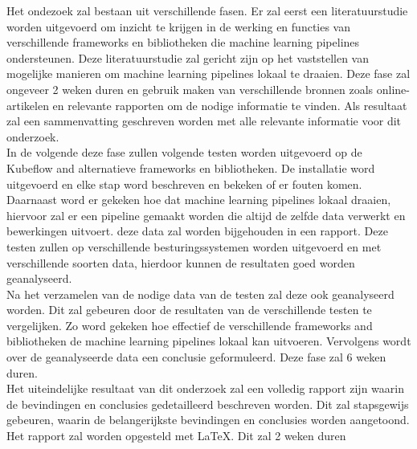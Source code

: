 Het ondezoek zal bestaan uit verschillende fasen. Er zal eerst een literatuurstudie worden uitgevoerd om inzicht te krijgen in de werking en
functies van verschillende frameworks en bibliotheken die machine learning pipelines ondersteunen.
Deze literatuurstudie zal gericht zijn op het vaststellen van mogelijke manieren om machine learning pipelines lokaal te draaien. Deze fase zal ongeveer 2 weken duren en gebruik maken van verschillende bronnen zoals online-artikelen en relevante rapporten om de nodige informatie te vinden. Als resultaat zal een sammenvatting geschreven worden met alle relevante informatie voor dit onderzoek.\\

In de volgende deze fase zullen volgende testen worden uitgevoerd op de Kubeflow and alternatieve frameworks en bibliotheken. De installatie word uitgevoerd en elke stap word beschreven en bekeken of er fouten komen. Daarnaast word er gekeken hoe dat machine learning pipelines lokaal draaien, hiervoor zal er een pipeline gemaakt worden die altijd de zelfde data verwerkt en bewerkingen uitvoert. deze data zal worden bijgehouden in een rapport.
Deze testen zullen op verschillende besturingssystemen worden uitgevoerd en met verschillende soorten data, hierdoor kunnen de resultaten goed worden geanalyseerd.\\

Na het verzamelen van de nodige data van de testen zal deze ook geanalyseerd worden. Dit zal gebeuren door de resultaten van de verschillende testen te vergelijken. Zo word gekeken hoe effectief de verschillende frameworks and bibliotheken de machine learning pipelines lokaal kan uitvoeren. Vervolgens wordt over de geanalyseerde data een conclusie geformuleerd.
Deze fase zal 6 weken duren.\\

Het uiteindelijke resultaat van dit onderzoek zal een volledig rapport zijn waarin de bevindingen en conclusies  gedetailleerd beschreven worden. Dit zal stapsgewijs gebeuren, waarin de belangerijkste bevindingen en conclusies worden aangetoond. Het rapport zal worden opgesteld met LaTeX. Dit zal 2 weken duren\\





